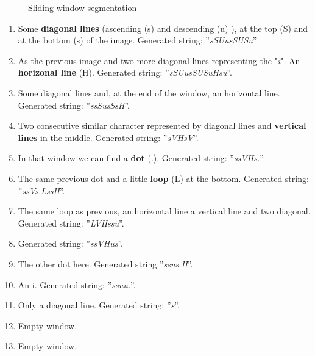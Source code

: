 \begin{figure}[!ht]
 \caption{Sliding window segmentation}
 \end{figure}

\begin{enumerate}[label=(\alph*)]
\item Some \textbf{diagonal lines} (ascending (s) and descending (u) ), at the top (S) and at the bottom (s) of the image. Generated string: ''\emph{sSUusSUSu}''.
\item As the previous image and two more diagonal lines representing the "\emph{i}". An \textbf{horizonal line} (H). Generated string: ''\emph{sSUusSUSuHsu}''.
\item Some diagonal lines and, at the end of the window, an horizontal line. Generated string: ''\emph{ssSusSsH}''.
\item Two consecutive similar character represented by diagonal lines and \textbf{vertical lines} in the middle. Generated string: ''\emph{sVHsV}''.
\item In that window we can find a \textbf{dot} (.). Generated string: ''\emph{ssVHs.}''
\item The same previous dot and a little \textbf{loop} (L) at the bottom. Generated string: ''\emph{ssVs.LssH}''.
\item The same loop as previous, an horizontal line a vertical line and two diagonal. Generated string: ''\emph{LVHssu}''.
\item Generated string: ''\emph{ssVHus}''.
\item The other dot here. Generated string ''\emph{ssus.H}''.
\item An i. Generated string: ''\emph{ssuu.}''.
\item Only a diagonal line. Generated string: ''\emph{s}''.
\item Empty window.
\item Empty window.
\end{enumerate}

